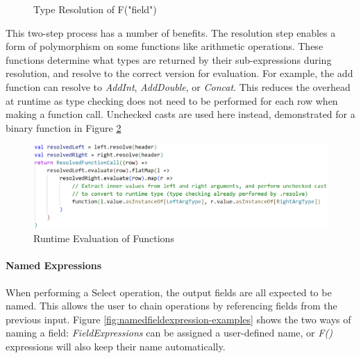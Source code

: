 \begin{figure}[ht]
	\centering
	\qquad
	
	\caption{Type Resolution of F(\textcolor{deepgreen}{"field"})}
	\label{fig:field-type-resolution}
\end{figure}

This two-step process has a number of benefits. The resolution step enables a form of polymorphism on some functions like arithmetic operations. These functions determine what types are returned by their sub-expressions during resolution, and resolve to the correct version for evaluation. For example, the add function can resolve to \textit{AddInt}, \textit{AddDouble}, or \textit{Concat}. This reduces the overhead at runtime as type checking does not need to be performed for each row when making a function call. Unchecked casts are used here instead, demonstrated for a binary function in Figure \ref{fig:fieldexpression-unchecked-casts}
	
\begin{figure}[ht]
	\centering
	\includegraphics[width=\textwidth]{chapters/diagrams/implementation/type-resolution-unchecked-casts}
	\caption{Runtime Evaluation of Functions}
	\label{fig:fieldexpression-unchecked-casts}
\end{figure}


\paragraph{Named Expressions}
When performing a Select operation, the output fields are all expected to be named. This allows the user to chain operations by referencing fields from the previous input. Figure \ref{fig:namedfieldexpression-examples} shows the two ways of naming a field: \textit{FieldExpressions} can be assigned a user-defined name, or \textit{F()} expressions will also keep their name automatically.

